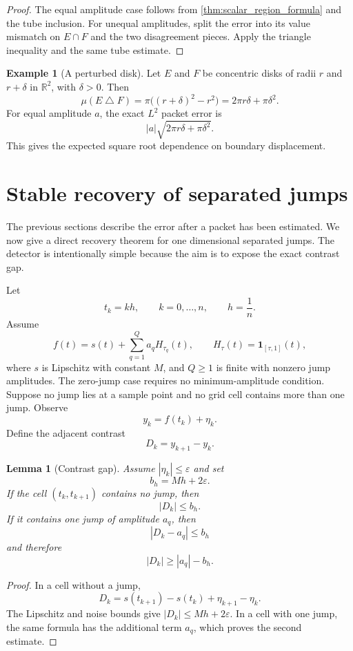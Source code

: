 \documentclass[11pt,a4paper]{article}
\newtheorem{lemma}[theorem]{Lemma}
\theoremstyle{definition}
\newtheorem{example}[theorem]{Example}
\theoremstyle{remark}
\newcommand{\RR}{\mathbb R}
\newcommand{\one}{\mathbf 1}
\begin{document}
\begin{proof}
The equal amplitude case follows from \cref{thm:scalar_region_formula} and the tube inclusion. For unequal amplitudes, split the error into its value mismatch on \(E\cap F\) and the two disagreement pieces. Apply the triangle inequality and the same tube estimate.
\end{proof}

\begin{example}[A perturbed disk]\label{ex:perturbed_disk}
Let \(E\) and \(F\) be concentric disks of radii \(r\) and \(r+\delta\) in \(\RR^2\), with \(\delta>0\). Then
\[
\mu(E\mathbin\triangle F)
=
\pi\bigl((r+\delta)^2-r^2\bigr)
=
2\pi r\delta+\pi\delta^2.
\]
For equal amplitude \(a\), the exact \(L^2\) packet error is
\[
|a|\sqrt{2\pi r\delta+\pi\delta^2}.
\]
This gives the expected square root dependence on boundary displacement.
\end{example}

\section{Stable recovery of separated jumps}\label{extension:section:09}\label{sec:jump_recovery}

The previous sections describe the error after a packet has been estimated. We now give a direct recovery theorem for one dimensional separated jumps. The detector is intentionally simple because the aim is to expose the exact contrast gap.

Let
\[
t_k=kh,
\qquad
k=0,\ldots,n,
\qquad
h=\frac1n.
\]
Assume
\[
f(t)
=
s(t)+\sum_{q=1}^{Q}a_qH_{\tau_q}(t),
\qquad
H_\tau(t)=\one_{[\tau,1]}(t),
\]
where \(s\) is Lipschitz with constant \(M\), and \(Q\geq1\) is finite with nonzero jump amplitudes. The zero-jump case requires no minimum-amplitude condition. Suppose no jump lies at a sample point and no grid cell contains more than one jump. Observe
\[
y_k=f(t_k)+\eta_k.
\]
Define the adjacent contrast
\[
D_k=y_{k+1}-y_k.
\]

\begin{lemma}[Contrast gap]\label{lem:contrast_gap}
Assume \(|\eta_k|\leq\varepsilon\) and set
\[
b_h=Mh+2\varepsilon.
\]
If the cell \((t_k,t_{k+1})\) contains no jump, then
\[
|D_k|\leq b_h.
\]
If it contains one jump of amplitude \(a_q\), then
\[
|D_k-a_q|\leq b_h
\]
and therefore
\[
|D_k|\geq |a_q|-b_h.
\]
\end{lemma}

\begin{proof}
In a cell without a jump,
\[
D_k=s(t_{k+1})-s(t_k)+\eta_{k+1}-\eta_k.
\]
The Lipschitz and noise bounds give \(|D_k|\leq Mh+2\varepsilon\). In a cell with one jump, the same formula has the additional term \(a_q\), which proves the second estimate.
\end{proof}
\end{document}
